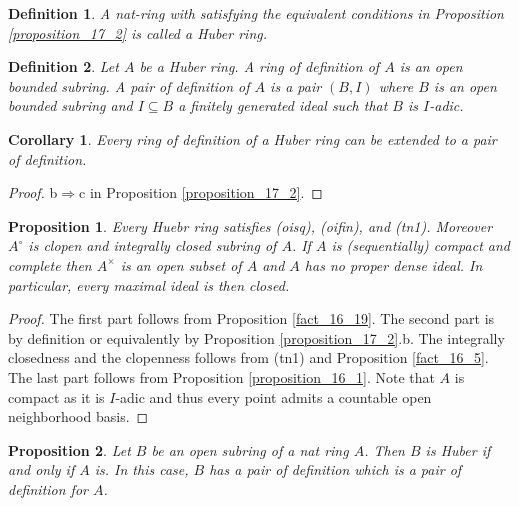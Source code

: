 \documentclass[8pt]{article}
\numberwithin{equation}{section}
\newtheorem{proposition}{Proposition}[subsection]
\newtheorem{definition}{Definition}[subsection]
\newtheorem{corollary}{Corollary} [subsection]
\begin{document}
\begin{definition}
    \label{definition_17_3}
    A nat-ring with satisfying the equivalent conditions in Proposition \ref{proposition_17_2} is called a Huber ring.%
\end{definition}

\begin{definition}
    \label{definition_17_3_b}
   Let $A$ be a Huber ring. A ring of definition of $A$ is an open bounded subring. A pair of definition of $A$ is a pair $(B,I)$ where $B$ is an open bounded subring and $I\subseteq B$ a finitely generated ideal such that $B$ is $I$-adic.
\end{definition}

\begin{corollary}
    Every ring of definition of a Huber ring can be extended to a pair of definition.
\end{corollary}
\begin{proof}
    b$\Rightarrow$c in Proposition \ref{proposition_17_2}.
\end{proof}

\begin{proposition}
    \label{fact_17_7}
    Every Huebr ring satisfies (oisq), (oifin), and (tn1). 
    Moreover $A^\circ$ is clopen and integrally closed subring of $A$. 
    If $A$ is (sequentially) compact and complete %
    then $A^\times$ is an open subset of $A$ and $A$ has no proper dense ideal. In particular, every maximal ideal is then closed.
\end{proposition}
\begin{proof}
    The first part follows from Proposition \ref{fact_16_19}. The second part is by definition or equivalently by Proposition \ref{proposition_17_2}.b. 
    The integrally closedness and the clopenness follows from (tn1) and Proposition \ref{fact_16_5}. The last part follows from Proposition \ref{proposition_16_1}. Note that $A$ is compact as it is $I$-adic and thus every point admits a countable open neighborhood basis.
\end{proof}

\begin{proposition}
    \label{fact_17_8}
    Let $B$ be an open subring of a nat ring $A$. Then $B$ is Huber if and only if $A$ is. In this case, $B$ has a pair of definition which is a pair of definition for $A$.
\end{proposition}
\end{document}
